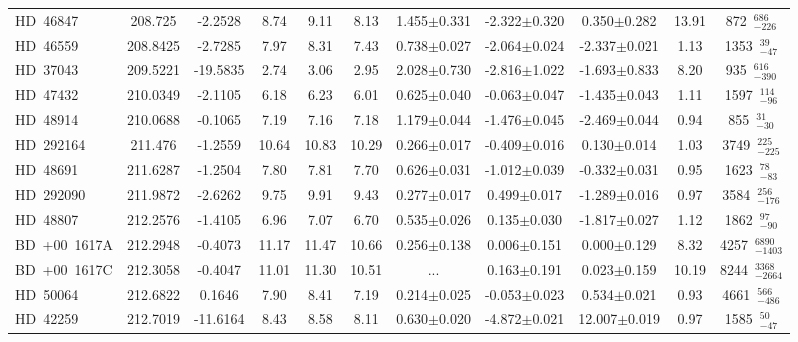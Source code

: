 {\begin{longtable}{lcccccccccc}
\noalign{\smallskip}
HD~46847 & 208.725 & -2.2528 & 8.74 & 9.11 & 8.13 & 1.455$\pm$0.331 & -2.322$\pm$0.320 & 0.350$\pm$0.282 & 13.91 & 872~$_{-226}^{686}$ \\
\noalign{\smallskip}
HD~46559 & 208.8425 & -2.7285 & 7.97 & 8.31 & 7.43 & 0.738$\pm$0.027 & -2.064$\pm$0.024 & -2.337$\pm$0.021 & 1.13 & 1353~$_{-47}^{39}$ \\
\noalign{\smallskip}
HD~37043 & 209.5221 & -19.5835 & 2.74 & 3.06 & 2.95 & 2.028$\pm$0.730 & -2.816$\pm$1.022 & -1.693$\pm$0.833 & 8.20 & 935~$_{-390}^{616}$ \\
\noalign{\smallskip}
HD~47432 & 210.0349 & -2.1105 & 6.18 & 6.23 & 6.01 & 0.625$\pm$0.040 & -0.063$\pm$0.047 & -1.435$\pm$0.043 & 1.11 & 1597~$_{-96}^{114}$ \\
\noalign{\smallskip}
HD~48914 & 210.0688 & -0.1065 & 7.19 & 7.16 & 7.18 & 1.179$\pm$0.044 & -1.476$\pm$0.045 & -2.469$\pm$0.044 & 0.94 & 855~$_{-30}^{31}$ \\
\noalign{\smallskip}
HD~292164 & 211.476 & -1.2559 & 10.64 & 10.83 & 10.29 & 0.266$\pm$0.017 & -0.409$\pm$0.016 & 0.130$\pm$0.014 & 1.03 & 3749~$_{-225}^{225}$ \\
\noalign{\smallskip}
HD~48691 & 211.6287 & -1.2504 & 7.80 & 7.81 & 7.70 & 0.626$\pm$0.031 & -1.012$\pm$0.039 & -0.332$\pm$0.031 & 0.95 & 1623~$_{-83}^{78}$ \\
\noalign{\smallskip}
HD~292090 & 211.9872 & -2.6262 & 9.75 & 9.91 & 9.43 & 0.277$\pm$0.017 & 0.499$\pm$0.017 & -1.289$\pm$0.016 & 0.97 & 3584~$_{-176}^{256}$ \\
\noalign{\smallskip}
HD~48807 & 212.2576 & -1.4105 & 6.96 & 7.07 & 6.70 & 0.535$\pm$0.026 & 0.135$\pm$0.030 & -1.817$\pm$0.027 & 1.12 & 1862~$_{-90}^{97}$ \\
\noalign{\smallskip}
BD~+00~1617A & 212.2948 & -0.4073 & 11.17 & 11.47 & 10.66 & 0.256$\pm$0.138 & 0.006$\pm$0.151 & 0.000$\pm$0.129 & 8.32 & 4257~$_{-1403}^{6890}$ \\
\noalign{\smallskip}
BD~+00~1617C & 212.3058 & -0.4047 & 11.01 & 11.30 & 10.51 & ... & 0.163$\pm$0.191 & 0.023$\pm$0.159 & 10.19 & 8244~$_{-2664}^{3368}$ \\
\noalign{\smallskip}
HD~50064 & 212.6822 & 0.1646 & 7.90 & 8.41 & 7.19 & 0.214$\pm$0.025 & -0.053$\pm$0.023 & 0.534$\pm$0.021 & 0.93 & 4661~$_{-486}^{566}$ \\
\noalign{\smallskip}
HD~42259 & 212.7019 & -11.6164 & 8.43 & 8.58 & 8.11 & 0.630$\pm$0.020 & -4.872$\pm$0.021 & 12.007$\pm$0.019 & 0.97 & 1585~$_{-47}^{50}$ \\

\end{longtable}}
